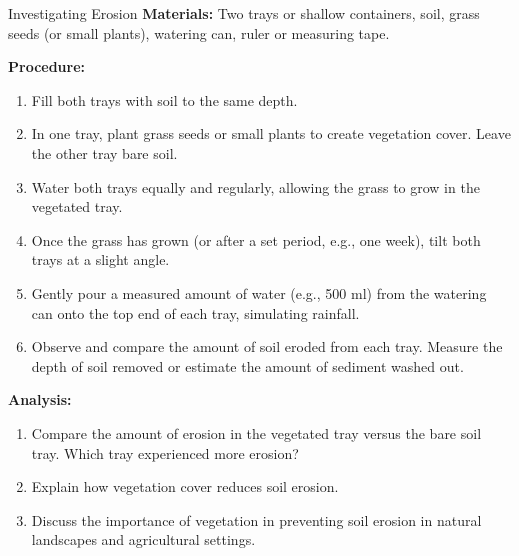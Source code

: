 \begin{investigation}{Investigating Erosion}
\textbf{Materials:}  Two trays or shallow containers, soil, grass seeds (or small plants), watering can, ruler or measuring tape.

\textbf{Procedure:}
\begin{enumerate}
    \item  Fill both trays with soil to the same depth.
    \item  In one tray, plant grass seeds or small plants to create vegetation cover. Leave the other tray bare soil.
    \item  Water both trays equally and regularly, allowing the grass to grow in the vegetated tray.
    \item  Once the grass has grown (or after a set period, e.g., one week), tilt both trays at a slight angle.
    \item  Gently pour a measured amount of water (e.g., 500 ml) from the watering can onto the top end of each tray, simulating rainfall.
    \item  Observe and compare the amount of soil eroded from each tray.  Measure the depth of soil removed or estimate the amount of sediment washed out.
\end{enumerate}

\textbf{Analysis:}
\begin{enumerate}
    \item  Compare the amount of erosion in the vegetated tray versus the bare soil tray.  Which tray experienced more erosion?
    \item  Explain how vegetation cover reduces soil erosion.
    \item  Discuss the importance of vegetation in preventing soil erosion in natural landscapes and agricultural settings.
\end{enumerate}
\end{investigation}


